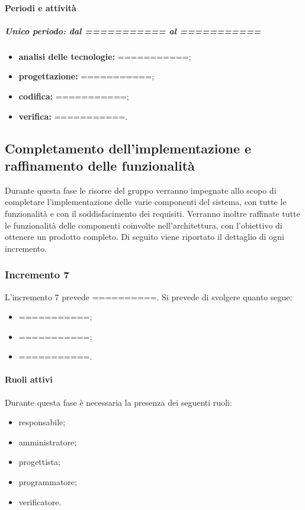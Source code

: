 \paragraph{Periodi e attività}
\subparagraph{Unico periodo: dal =========== al ===========}
\begin{itemize}
	\item \textbf{analisi delle tecnologie:} ===========;
	\item \textbf{progettazione:} ===========;
	\item \textbf{codifica:} ===========;
	\item \textbf{verifica:} ===========.
\end{itemize}

\newpage 


\newpage %

\subsection{Completamento dell'implementazione e raffinamento delle funzionalità}
Durante questa fase le risorse del gruppo verranno impegnate allo scopo di completare l'implementazione delle varie componenti del sistema, con tutte le funzionalità e con il soddisfacimento dei requisiti. Verranno inoltre raffinate tutte le funzionalità delle componenti coinvolte nell'architettura, con l'obiettivo di ottenere un prodotto completo.
\newline
Di seguito viene riportato il dettaglio di ogni incremento.

\subsubsection{Incremento 7}
L'incremento 7 prevede ==========. Si prevede di svolgere quanto segue:
\begin{itemize}
	\item ===========;
	\item ===========;
	\item ===========.
\end{itemize}

\paragraph{Ruoli attivi}
Durante questa fase è necessaria la presenza dei seguenti ruoli: 
\begin{itemize} 
	\item responsabile; 
	\item amministratore; 
	\item progettista; 
	\item programmatore; 
	\item verificatore.
\end{itemize}

